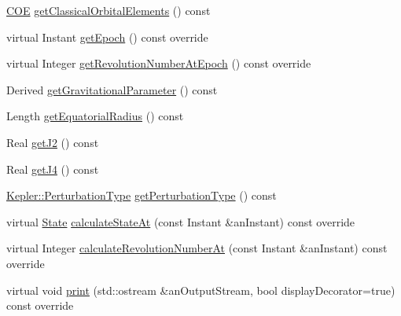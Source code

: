 \begin{DoxyCompactItemize}
\item 
\hyperlink{classostk_1_1astro_1_1trajectory_1_1orbit_1_1models_1_1kepler_1_1_c_o_e}{C\+OE} \hyperlink{classostk_1_1astro_1_1trajectory_1_1orbit_1_1models_1_1_kepler_a1a5e2d4a27c4e20d91924a3a751cbba4}{get\+Classical\+Orbital\+Elements} () const
\item 
virtual Instant \hyperlink{classostk_1_1astro_1_1trajectory_1_1orbit_1_1models_1_1_kepler_a01551fd006896966d4d5e4442c182f92}{get\+Epoch} () const override
\item 
virtual Integer \hyperlink{classostk_1_1astro_1_1trajectory_1_1orbit_1_1models_1_1_kepler_a2aa5b94462f65ea7e703d319d3e028b3}{get\+Revolution\+Number\+At\+Epoch} () const override
\item 
Derived \hyperlink{classostk_1_1astro_1_1trajectory_1_1orbit_1_1models_1_1_kepler_af7e879bf88e9a388c86d836ac50d6a97}{get\+Gravitational\+Parameter} () const
\item 
Length \hyperlink{classostk_1_1astro_1_1trajectory_1_1orbit_1_1models_1_1_kepler_abd9cabfcb1a39b627d2809d3cb11dad8}{get\+Equatorial\+Radius} () const
\item 
Real \hyperlink{classostk_1_1astro_1_1trajectory_1_1orbit_1_1models_1_1_kepler_aeff5940802c7795d9d709a0fdf15fa64}{get\+J2} () const
\item 
Real \hyperlink{classostk_1_1astro_1_1trajectory_1_1orbit_1_1models_1_1_kepler_a15e3600757f990a833910dc54c389462}{get\+J4} () const
\item 
\hyperlink{classostk_1_1astro_1_1trajectory_1_1orbit_1_1models_1_1_kepler_a3750f9177ff06a1938826e2c2881d5a9}{Kepler\+::\+Perturbation\+Type} \hyperlink{classostk_1_1astro_1_1trajectory_1_1orbit_1_1models_1_1_kepler_a8f6d00fe11481e9267aded6f9aeafb1a}{get\+Perturbation\+Type} () const
\item 
virtual \hyperlink{classostk_1_1astro_1_1trajectory_1_1_state}{State} \hyperlink{classostk_1_1astro_1_1trajectory_1_1orbit_1_1models_1_1_kepler_a4de0c3d7a2b37c1c2ab4d6e207339809}{calculate\+State\+At} (const Instant \&an\+Instant) const override
\item 
virtual Integer \hyperlink{classostk_1_1astro_1_1trajectory_1_1orbit_1_1models_1_1_kepler_a312fe4296eadcb00799ce9981b0c4f18}{calculate\+Revolution\+Number\+At} (const Instant \&an\+Instant) const override
\item 
virtual void \hyperlink{classostk_1_1astro_1_1trajectory_1_1orbit_1_1models_1_1_kepler_a9c71803234f356ade03453e3ae19ae94}{print} (std\+::ostream \&an\+Output\+Stream, bool display\+Decorator=true) const override
\end{DoxyCompactItemize}
